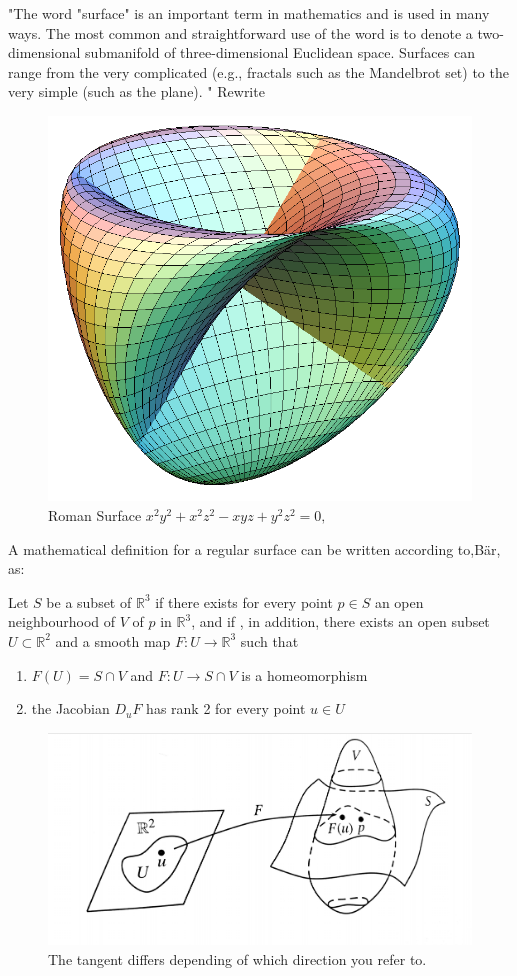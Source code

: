 "The word "surface" is an important term in mathematics and is used in many ways. The most common and straightforward use of the word is to denote a two-dimensional submanifold of three-dimensional Euclidean space. Surfaces can range from the very complicated (e.g., fractals such as the Mandelbrot set) to the very simple (such as the plane). " Rewrite

\begin{figure}[H]
\centering
\includegraphics[width=0.5\linewidth]{figure/Theory/Romansurface.png}
 
\caption{Roman Surface $ x^2 y^2+x^2 z^2-x y z+y^2 z^2 = 0,$  }
\end{figure}





A mathematical definition for a regular surface can be written according to,Bär, as:

\vspace{5mm} %

Let $S$  be a subset of $\mathbb{R}^3$ if there exists for every point $p \in S$ an open neighbourhood of $V$  of $p$ in $\mathbb{R}^3$, and if , in addition, there exists an open subset $U \subset \mathbb{R}^2$ and a smooth map $F:U \rightarrow \mathbb{R}^3$ such that
 
\begin{enumerate}
\item $ F(U) = S \cap V$  and $F:U \rightarrow S \cap V$ is a homeomorphism 
\item  the Jacobian $D_u F$ has rank 2 for every point $u \in U$  

\end{enumerate}


\begin{figure}[H]
\centering
\includegraphics[width=0.7\linewidth]{figure/Theory/surfdef.pdf}
 
\caption{The tangent differs depending of which direction you refer to. }
\end{figure}


